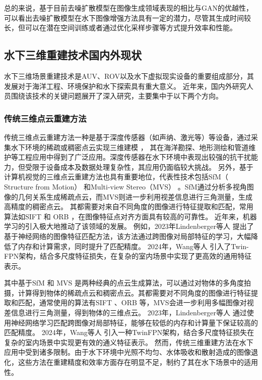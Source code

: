 总的来说，基于目前去噪扩散模型在图像生成领域表现的相比与GAN的优越性，可以看出去噪扩散模型在水下图像增强方法具有一定的潜力，尽管其生成时间较长，但可以在潜在空间训练或者通过优化采样步骤等方式提升效率和性能。

\subsection{水下三维重建技术国内外现状}
水下三维场景重建技术是AUV、ROV以及水下虚拟现实设备的重要组成部分，其发展对于海洋工程、环境保护和水下探索具有重大意义。
近年来，国内外研究人员围绕该技术的关键问题展开了深入研究，主要集中于以下两个方向。

\subsubsection{传统三维点云重建方法}
传统三维点云重建方法一种是基于深度传感器（如声纳、激光等）等设备，通过采集水下环境的稀疏或稠密点云实现三维建模 \cite{sonar1}\cite{sonar2}，
其在海洋勘探、地形测绘和管道维护等工程应用中得到了广泛应用。深度传感器在水下环境中表现出较强的抗干扰能力，但受限于设备成本及数据处理复杂性，其应用仍面临较大挑战。
另外，基于计算机视觉的三维点云重建方法也具有重要地位，代表性技术包括SfM（ Structure from Motion）\cite{sfm1, sfm2} 和Multi-view Stereo（MVS） \cite{mvs}。SfM通过分析多视角图像的几何关系生成稀疏点云，而MVS则进一步利用视差信息进行三角测量，生成高精度的稠密点云。
其都需要对来自不同角度的图像进行特征提取和匹配，常用算法如SIFT \cite{sift} 和 ORB \cite{orb}，在图像特征点对齐方面具有较高的可靠性。
近年来，机器学习的引入极大地推动了该领域的发展。
例如，2023年Lindenberger等人 \cite{lightglue} 提出了基于神经网络的图像特征匹配方法，该方法通过跨图像对局部特征的学习，大幅降低了内存和计算需求，同时提升了匹配精度。
2024年，Wang等人 \cite{enhancing-mvs} 引入了Twin-FPN架构，结合多尺度特征损失，在复杂的室内场景中实现了更高效的通用特征表示。

其中基于SfM \cite{sfm1, sfm2} 和 MVS \cite{mvs} 是两种经典的点云生成算法，可以通过对物体的多角度拍摄，计算得到物体的稀疏点云和稠密点云。其都需要对不同角度的图像进行特征提取和匹配，通常使用的算法有SIFT \cite{sift}、ORB \cite{orb}等，MVS会进一步利用多幅图像对视差信息进行三角测量，得到物体的三维点云。
2023年，Lindenberger等人 \cite{lightglue}通过使用神经网络学习匹配跨图像对局部特征，能够在较低的内存和计算量下保证较高的匹配精度。
2024年，Wang等人 \cite{enhancing-mvs}引入一种Twin\-FPN架构，结合多尺度特征损失在复杂的室内场景中实现更有效的通义特征表示。
然而，传统三维重建方法在水下应用中受到诸多限制。由于水下环境中光照不均匀、水体吸收和散射造成的图像退化，这些方法在重建精度和效率方面存在明显不足，制约了其在水下场景中的适用性。

